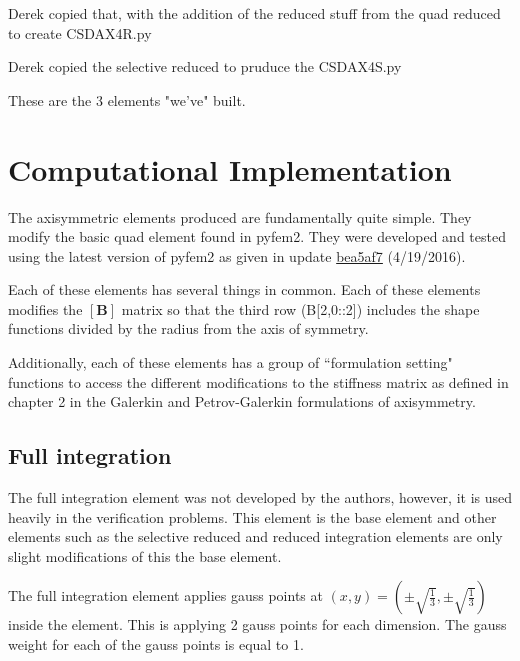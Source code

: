 \documentclass[10pt,letterpaper]{report}
\numberwithin{equation}{chapter}
\begin{document}
Derek copied that, with the addition of the reduced stuff from the quad reduced to create CSDAX4R.py

Derek copied the selective reduced to pruduce the CSDAX4S.py

These are the 3 elements "we've" built.

\chapter{Computational Implementation}
The axisymmetric elements produced are fundamentally quite simple. They modify the basic quad element found in pyfem2. They were developed and tested using the latest version of pyfem2 as given in update \hyperlink{https://github.com/tjfulle/pyfem2/commit/bea5af7b7dc98cb5529406c07bc4a8b18ae5e584}{bea5af7} (4/19/2016).

Each of these elements has several things in common. Each of these elements modifies the $[\pmb{B}]$ matrix so that the third row (B[2,0::2]) includes the shape functions divided by the radius from the axis of symmetry.

Additionally, each of these elements has a group of ``formulation setting" functions to access the different modifications to the stiffness matrix as defined in chapter 2 in the Galerkin and Petrov-Galerkin formulations of axisymmetry. 
\section{Full integration}
The full integration element was not developed by the authors, however, it is used heavily in the verification problems. This element is the base element and other elements such as the selective reduced and reduced integration elements are only slight modifications of this the base element.

The full integration element applies gauss points at $(x,y)=(\pm\sqrt{\frac{1}{3}},\pm\sqrt{\frac{1}{3}})$ inside the element. This is applying 2 gauss points for each dimension. The gauss weight for each of the gauss points is equal to 1.
\end{document}
